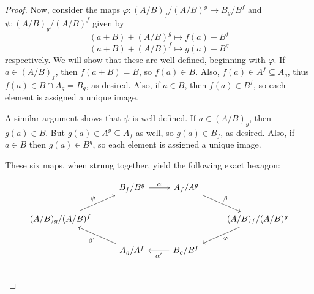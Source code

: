 \documentclass[10pt]{article}
\begin{document}
\begin{enumerate}
\begin{enumerate}
\begin{proof}
Now, consider the maps $\varphi:(A/B)_f / (A/B)^g \rightarrow B_g / B^f$ and $\psi : (A/B)_g / (A/B)^f$ given by
$$
(a+B) + (A/B)^g \mapsto f(a) + B^f
$$
$$
(a+B) + (A/B)^f \mapsto g(a) + B^g
$$
respectively.  We will show that these are well-defined, beginning with $\varphi$.  If $a \in (A/B)_f$, then $f(a + B) = B$, so $f(a) \in B$.  Also, $f(a) \in A^f \subseteq A_g$, thus $f(a) \in B \cap A_g = B_g$, as desired.  Also, if $a \in B$, then $f(a) \in B^f$, so each element is assigned a unique image.

A similar argument shows that $\psi$ is well-defined.  If $a \in (A/B)_g$, then $g(a) \in B$.  But $g(a) \in A^g \subseteq A_f$ as well, so $g(a) \in B_f$, as desired.  Also, if $a \in B$ then $g(a) \in B^g$, so each element is assigned a unique image.

These six maps, when strung together, yield the following exact hexagon:

$$
\begin{tikzcd}
\ & B_f / B^g \arrow[r, "\alpha"] & A_f / A^g \arrow[dr, "\beta"] &  \ \\
(A/B)_g / (A/B)^f \arrow[ur, "\psi"] & \ & \ & (A/B)_f / (A/B)^g \arrow[dl, "\varphi"] \\
\ & A_g / A^f \arrow[ul, "\beta'"] & B_g / B^f \arrow[l, "\alpha'"] & \ \\
\end{tikzcd}
$$

\begin{comment}
$$
\begin{tikzcd}
B_f / B^g \arrow[r, "\alpha"] & A_f / A^g \arrow[r, "\beta"] & (A/B)_f / (A/B)^g \arrow[dd, "\varphi"] \\ \ & \ & \phantom{a} \\
(A/B)_g / (A/B)^f \arrow[uu, "\psi"] & A_g / A^f \arrow[l, "\beta'"] & B_g / B^f \arrow[l, "\alpha'"]
\end{tikzcd}
$$
\end{comment}


\end{proof}
\end{enumerate}
\end{enumerate}
\end{document}
